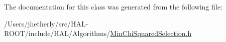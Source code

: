 The documentation for this class was generated from the following file\+:\begin{DoxyCompactItemize}
\item 
/\+Users/jhetherly/src/\+H\+A\+L-\/\+R\+O\+O\+T/include/\+H\+A\+L/\+Algorithms/\hyperlink{_min_chi_squared_selection_8h}{Min\+Chi\+Squared\+Selection.\+h}\end{DoxyCompactItemize}
